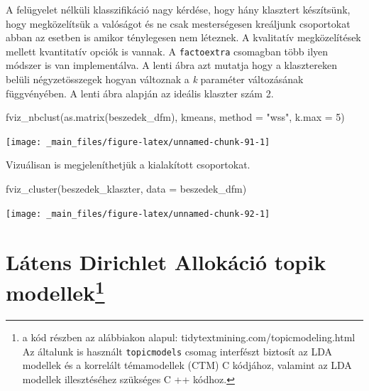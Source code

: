 \documentclass[
]{book}
\newenvironment{Shaded}{\begin{snugshade}}{\end{snugshade}}
\newcommand{\AttributeTok}[1]{\textcolor[rgb]{0.77,0.63,0.00}{#1}}
\newcommand{\DecValTok}[1]{\textcolor[rgb]{0.00,0.00,0.81}{#1}}
\newcommand{\FunctionTok}[1]{\textcolor[rgb]{0.00,0.00,0.00}{#1}}
\newcommand{\NormalTok}[1]{#1}
\newcommand{\StringTok}[1]{\textcolor[rgb]{0.31,0.60,0.02}{#1}}
\begin{document}
A felügyelet nélküli klasszifikáció nagy kérdése, hogy hány klasztert
készítsünk, hogy megközelítsük a valóságot és ne csak mesterségesen
kreáljunk csoportokat abban az esetben is amikor ténylegesen nem
léteznek. A kvalitatív megközelítések mellett kvantitatív opciók is
vannak. A \texttt{factoextra} csomagban több ilyen módszer is van
implementálva. A lenti ábra azt mutatja hogy a klasztereken belüli
négyzetösszegek hogyan változnak a \emph{k} paraméter változásának
függvényében. A lenti ábra alapján az ideális klaszter szám 2.

\begin{Shaded}
\begin{Highlighting}[]

\FunctionTok{fviz\_nbclust}\NormalTok{(}\FunctionTok{as.matrix}\NormalTok{(beszedek\_dfm), kmeans, }\AttributeTok{method =} \StringTok{"wss"}\NormalTok{, }\AttributeTok{k.max =} \DecValTok{5}\NormalTok{)}
\end{Highlighting}
\end{Shaded}

\begin{center}\texttt{[image: \_main\_files/figure-latex/unnamed-chunk-91-1]} \end{center}

Vizuálisan is megjeleníthetjük a kialakított csoportokat.

\begin{Shaded}
\begin{Highlighting}[]
\FunctionTok{fviz\_cluster}\NormalTok{(beszedek\_klaszter, }\AttributeTok{data =}\NormalTok{ beszedek\_dfm)}
\end{Highlighting}
\end{Shaded}

\begin{center}\texttt{[image: \_main\_files/figure-latex/unnamed-chunk-92-1]} \end{center}

\hypertarget{luxe1tens-dirichlet-allokuxe1ciuxf3-topik-modellekklasztering_topicmodellek-1}{%
\section[Látens Dirichlet Allokáció topik
modellek]{\texorpdfstring{Látens Dirichlet Allokáció topik
modellek\footnote{a kód részben az alábbiakon alapul:
  tidytextmining.com/topicmodeling.html Az általunk is használt
  \texttt{topicmodels} csomag interfészt biztosít az LDA modellek és a
  korrelált témamodellek (CTM) C kódjához, valamint az LDA modellek
  illesztéséhez szükséges C ++ kódhoz.}}{Látens Dirichlet Allokáció topik modellek}}\label{luxe1tens-dirichlet-allokuxe1ciuxf3-topik-modellekklasztering_topicmodellek-1}}
\end{document}
